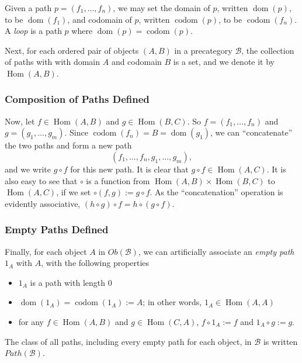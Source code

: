 \documentclass[12pt]{article}
\begin{document}
Given a path $p = (f_1,\ldots, f_n)$, we may set the domain of $p$, written $\operatorname{dom}(p)$, to be $\operatorname{dom}(f_1)$, and codomain of $p$, written $\operatorname{codom}(p)$, to be $\operatorname{codom}(f_n)$.  A \emph{loop} is a path $p$ where $\operatorname{dom}(p)=\operatorname{codom}(p)$.

Next, for each ordered pair of objects $(A,B)$ in a precategory $\mathcal{B}$, the collection of paths with with domain $A$ and codomain $B$ is a set, and we denote it by $\operatorname{Hom}(A,B)$.

\subsubsection*{Composition of Paths Defined}
Now, let $f\in \operatorname{Hom}(A,B)$ and $g\in \operatorname{Hom}(B,C)$.  So $f=(f_1,\ldots,f_n)$ and $g=(g_1,\ldots,g_m)$.  Since $\operatorname{codom}(f_n)=B=\operatorname{dom}(g_1)$, we can ``concatenate'' the two paths and form a new path $$(f_1,\ldots,f_n,g_1,\ldots,g_m),$$ and we write $g\circ f$ for this new path.  It is clear that $g\circ f\in \operatorname{Hom}(A,C)$.  It is also easy to see that $\circ$ is a function from $\operatorname{Hom}(A,B)\times \operatorname{Hom}(B,C)$ to $\operatorname{Hom}(A,C)$, if we set $\circ(f,g):= g\circ f$.  As the ``concatenation'' operation is evidently associative, $(h\circ g)\circ f=h\circ (g\circ f)$.

\subsubsection*{Empty Paths Defined}
Finally, for each object $A$ in $Ob(\mathcal{B})$, we can artificially associate an \emph{empty path} $1_A$ with $A$, with the following properties
\begin{itemize}
\item $1_A$ is a path with length $0$
\item $\operatorname{dom}(1_A)=\operatorname{codom}(1_A):=A$; in other words, $1_A\in \operatorname{Hom}(A,A)$
\item for any $f\in\operatorname{Hom}(A,B)$ and $g\in\operatorname{Hom}(C,A)$, $f\circ 1_A:=f$ and $1_A\circ g:=g$.
\end{itemize}
The class of all paths, including every empty path for each object, in $\mathcal{B}$ is written $Path(\mathcal{B})$.
\end{document}
